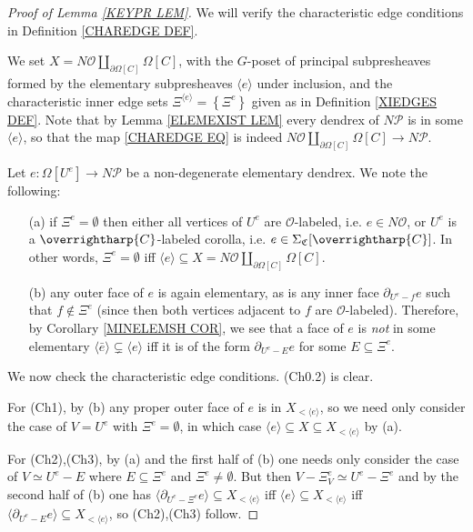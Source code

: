 \documentclass[a4paper,10pt
,draft
]{article}%
\numberwithin{equation}{section}
\numberwithin{figure}{section}
\theoremstyle{definition} %
\newcommand{\vect}[1]{\text{\overrightharp{\ensuremath{#1}}}}
\renewcommand{\O}{\ensuremath{\mathcal O}}
\renewcommand{\P}{\ensuremath{\mathcal P}}
\newcommand{\1}{\ensuremath{\mathbbm 1}}%
\begin{document}
\begin{proof}[Proof of Lemma \ref{KEYPR LEM}]
	
	We will verify the characteristic edge conditions in Definition \ref{CHAREDGE DEF}.

	We set $X = N \mathcal{O} \amalg_{\partial \Omega[C]} \Omega[C]$, 
	with the $G$-poset of principal subpresheaves formed by the 
	elementary subpresheaves 
	$\langle e \rangle$
	under inclusion, and the characteristic inner edge sets
	$\Xi^{\langle e \rangle} = \left\{\Xi^{e}\right\}$ given as in Definition \ref{XIEDGES DEF}.
	Note that by Lemma \ref{ELEMEXIST LEM}
	every dendrex of $N \mathcal{P}$ is in some 
	$\langle e \rangle$, so that the map
	\eqref{CHAREDGE EQ} is indeed
	$N \mathcal{O} \amalg_{\partial \Omega[C]} \Omega[C]
	\to N \mathcal{P}$.
	
	Let $e\colon \Omega[U^e] \to N \mathcal{P}$
	be a non-degenerate elementary dendrex. We note the following: 
	\begin{itemize}
		\item[(a)] if $\Xi^e = \emptyset$ then 
		either all vertices of $U^e$ are $\O$-labeled, i.e. $e \in N \mathcal{O}$, 
		or $U^e$ is a $\vect{C}$-labeled corolla, 
		i.e. $e \in \Sigma_{\mathfrak{C}}[\vect{C}]$.
		In other words, $\Xi^e = \emptyset$ iff 
		$\langle e \rangle \subseteq X = N \mathcal{O} \amalg_{\partial \Omega[C]} \Omega[C]$.
		\item[(b)] any outer face of $e$ is again elementary,
		as is any inner face $\partial_{U^e-f} e$ such that $f \not \in \Xi^e$
		(since then both vertices adjacent to $f$ are $\O$-labeled).
		Therefore, by Corollary \ref{MINELEMSH COR},
		we see that a face of $e$ is \emph{not} in
		some elementary $\langle \bar{e} \rangle \subsetneq \langle e \rangle$
		iff it is of the form
		$\partial_{U^e - E} e$
		for some $E \subseteq \Xi^e$.
	\end{itemize}

	We now check the characteristic edge conditions. (Ch0.2) is clear.
	
	For (Ch1), by (b) any proper outer face of $e$ is in $X_{<\langle e\rangle}$, so we need only consider the case of
	$V=U^e$ with $\Xi^e=\emptyset$, in which case
	$\langle e \rangle \subseteq X \subseteq X_{<\langle e\rangle}$ by (a).
	
	For (Ch2),(Ch3), by (a) and the first half of (b) one needs only consider the case of
	$V \simeq U^e - E$ where $E \subseteq \Xi^e$ and $\Xi^e \neq \emptyset$.
	But then
	$V - \Xi^e_V \simeq U^e- \Xi^e$
	and by the second half of (b)
	one has
	$\langle \partial_{U^e-\Xi^e}e \rangle \subseteq  X_{<\langle e\rangle}$
	iff
	$\langle e \rangle \subseteq  X_{<\langle e\rangle}$
	iff
	$\langle \partial_{U^e-E}e \rangle \subseteq  X_{<\langle e\rangle}$,
	so (Ch2),(Ch3) follow.
	

\end{proof}
\end{document}
